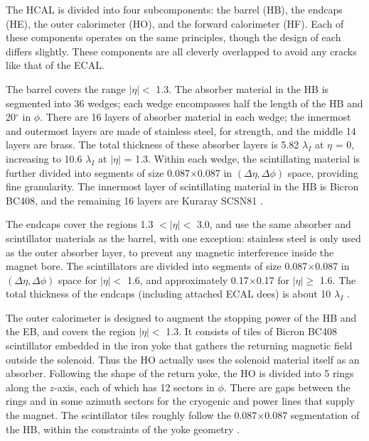 The HCAL is divided into four subcomponents: the barrel (HB), the
endcaps (HE), the outer calorimeter (HO), and the forward calorimeter
(HF). Each of these components operates on the same principles, though
the design of each differs slightly. These components are all cleverly
overlapped to avoid any cracks like that of the ECAL.

The barrel covers the range $|\eta| <$ 1.3. The absorber material in
the HB is segmented into 36 wedges; each wedge encompasses half the
length of the HB and 20$^\circ$ in $\phi$. There are 16 layers of
absorber material in each wedge; the innermost and outermost layers are
made of stainless steel, for strength, and the middle 14 layers are
brass. The total thickness of these absorber layers is 5.82
$\lambda_I$ at $\eta$ = 0, increasing to 10.6 $\lambda_I$ at $|\eta|$
= 1.3. Within each wedge, the scintillating material is further
divided into segments of size 0.087$\times$0.087 in $(\Delta\eta,\Delta\phi)$
space, providing fine granularity. The innermost layer of
scintillating material in the HB is Bicron BC408, and the remaining 16
layers are Kuraray SCSN81 \cite{accelexper}.

The endcaps cover the regions 1.3 $< |\eta| <$ 3.0, and use the same
absorber and scintillator materials as the barrel, with one exception:
stainless steel is only used as the outer absorber layer, to
prevent any magnetic interference inside the magnet bore. The
scintillators are divided into segments of size 0.087$\times$0.087 in
$(\Delta\eta,\Delta\phi)$ space for $|\eta| <$ 1.6, and approximately
0.17$\times$0.17 for $|\eta| \geq$ 1.6. The total thickness of the
endcaps (including attached ECAL dees) is about 10 $\lambda_I$
\cite{accelexper}.

The outer calorimeter is designed to augment the stopping power of the
HB and the EB, and covers the region $|\eta| <$ 1.3. It consists of
tiles of Bicron BC408 scintillator embedded in the iron yoke that
gathers the returning magnetic field outside the solenoid. Thus the HO
actually uses the solenoid material itself as an absorber.
Following the shape of the return yoke, the HO is divided into 5 rings
along the $z$-axis, each of which has 12 sectors in $\phi$. There are
gaps between the rings and in some azimuth sectors for the cryogenic
and power lines that supply the magnet. The scintillator tiles roughly
follow the 0.087$\times$0.087 segmentation of the HB, within the
constraints of the yoke geometry \cite{accelexper}.

